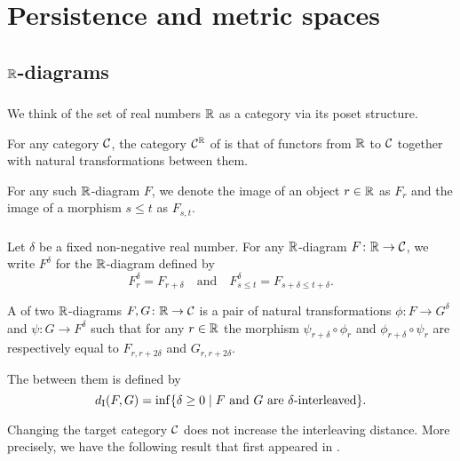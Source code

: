 
\section{Persistence and metric spaces}


\subsection{$\mathbb{R}$-diagrams}

\subsubsection{}

We think of the set of real numbers $\mathbb{R}$ as a category via its poset structure.

For any category $\mathcal{C}$, the category $\mathcal{C}^{\mathbb{R}}$ of  is that of functors from $\mathbb{R}$ to $\mathcal{C}$ together with natural transformations between them.

For any such $\mathbb{R}$-diagram $F$, we denote the image of an object $r \in \mathbb{R}$ as $F_r$ and the image of a morphism $s \leq t$ as $F_{s,t}$.

\subsubsection{}\label{ss:interleaving}

Let $\delta$ be a fixed non-negative real number.
For any $\mathbb{R}$-diagram $F \colon \mathbb{R} \to \mathcal{C}$, we write $F^\delta$ for the $\mathbb{R}$-diagram defined by
\[
F^\delta_r = F_{r+\delta}
\quad\text{and}\quad
F^\delta_{s \leq t} = F_{s+\delta \leq t+\delta}.
\]

A  of two $\mathbb{R}$-diagrams $F,G \colon \mathbb{R} \to \mathcal{C}$ is a pair of natural transformations
$\phi \colon F \to G^\delta$ and $\psi \colon G \to F^\delta$ such that for any $r \in \mathbb{R}$ the morphism $\psi_{r+\delta} \circ \phi_r$ and $\phi_{r+\delta} \circ \psi_r$ are respectively equal to $F_{r,r+2\delta}$ and $G_{r,r+2\delta}$.

The  between them is defined by
\[
d_{\mathrm{I}}(F, G) = \inf\{\delta \geq 0 \mid F \text{ and } G \text{ are } \delta\text{-interleaved}\}.
\]

Changing the target category $\mathcal{C}$  does not increase the interleaving distance.
More precisely, we have the following result that first appeared in \cite[p.~1508]{bubenik2015metrics}.

